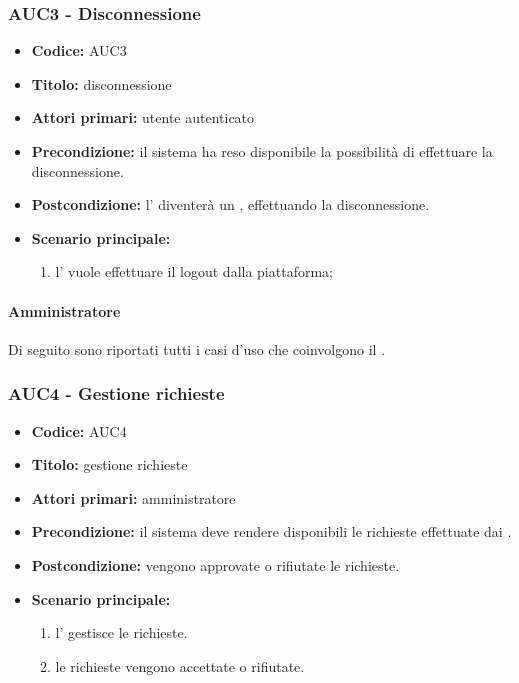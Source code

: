 \documentclass[casi-duso]{subfiles}
\begin{document}
\subsubsection{AUC3 - Disconnessione}
\label{subsub:AUC3}
\begin{itemize}
  \item \textbf{Codice:} AUC3
  \item \textbf{Titolo:} disconnessione
  \item \textbf{Attori primari:} utente autenticato
  \item \textbf{Precondizione:} il sistema ha reso disponibile la possibilità di effettuare la disconnessione.
  \item \textbf{Postcondizione:} l' diventerà un , effettuando la disconnessione.
  \item \textbf{Scenario principale:} 
  \begin{enumerate}
    \item l' vuole effettuare il logout dalla piattaforma;
  \end{enumerate}
\end{itemize}

\paragraph{Amministratore}
\label{par:amministratore}
Di seguito sono riportati tutti i casi d'uso che coinvolgono il  .



\subsubsection{AUC4 - Gestione richieste}
\label{subsub:AUC4}
\begin{itemize}
  \item \textbf{Codice:} AUC4
  \item \textbf{Titolo:} gestione richieste
  \item \textbf{Attori primari:} amministratore
  \item \textbf{Precondizione:} il sistema deve rendere disponibili le richieste effettuate dai .
  \item \textbf{Postcondizione:} vengono approvate o rifiutate le richieste.
  \item \textbf{Scenario principale:} 
  \begin{enumerate}
    \item l' gestisce le richieste.
    \item le richieste vengono accettate o rifiutate.
  \end{enumerate}
\end{itemize}
\end{document}
